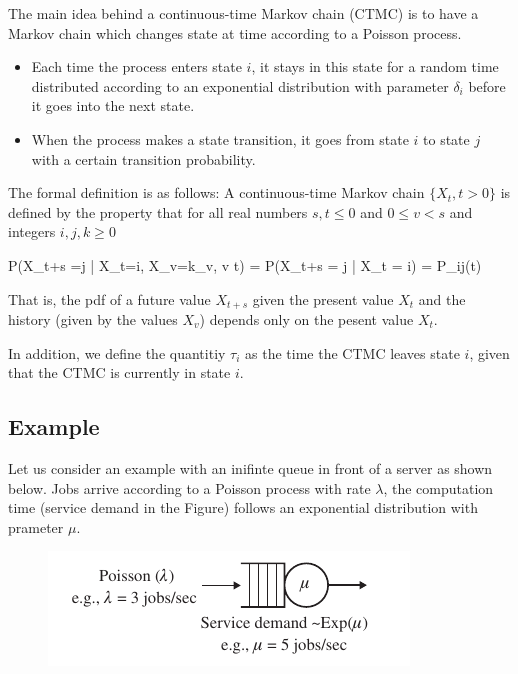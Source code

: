 
The main idea behind a continuous-time Markov chain (CTMC) is to have a Markov chain which changes state at time according to a Poisson process.

\begin{itemize}

	\item Each time the process enters state $i$, it stays in this state for a random time distributed according to an exponential distribution with parameter $\delta_i$ before it goes into the next state.

	\item When the process makes a state transition, it goes from state $i$ to state $j$ with a certain transition probability.

\end{itemize}


The formal definition is as follows: A continuous-time Markov chain $\{X_t, t > 0\}$ is defined by the property that for all real numbers $s,t \leq 0$ and $0 \leq v < s$ and integers $i,j,k \geq 0$

\bee
P(X_{t+s} =j | X_t=i, X_v=k_v, v \leq t) = P(X_{t+s} = j | X_t = i) = P_{ij}(t)
\eee

That is, the pdf of a future value $X_{t+s}$ given the present value $X_t$ and the history (given by the values $X_v$) depends only on the pesent value $X_t$.

In addition, we define the quantitiy $\tau_i$ as the time the CTMC leaves state $i$, given that the CTMC is currently in state $i$.



\subsection{Example}

Let us consider an example with an inifinte queue in front of a server as shown below. Jobs arrive according to a Poisson process with rate $\lambda$, the computation time (service demand in the Figure) follows an exponential distribution with prameter $\mu$.

\begin{figure}[hbt!]
\centering
\includegraphics[scale=0.75]{images/queuing_02_01.png}
\end{figure}


